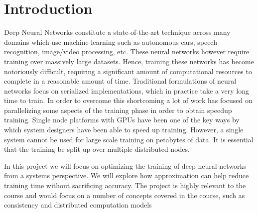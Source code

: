 \section{Introduction}
Deep Neural Networks constitute a state-of-the-art technique across many domains which use machine learning such as autonomous cars, speech recognition, image/video processing, etc. These neural networks however require training over massively large datasets. Hence, training these networks has become notoriously difficult, requiring a significant amount of computational resources to complete in a reasonable amount of time. Traditional formulations of neural networks focus on serialized implementations, which in practice take a very long time to train. In order to overcome this shortcoming a lot of work has focused on parallelizing some aspects of the training phase in order to obtain speedup training. Single node platforms with GPUs have been one of the key ways by which system designers have been able to speed up training. However, a single system cannot be used for large scale training on petabytes of data. It is essential that the training be split up over multiple distributed nodes.

In this project we will focus on optimizing the training of deep neural networks from a systems perspective.
We will explore how approximation can help reduce training time without sacrificing accuracy. The project
is highly relevant to the course and would focus on a number of concepts covered in the course, such as
consistency and distributed computation models

